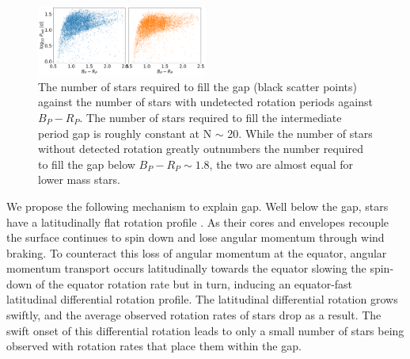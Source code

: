 \begin{figure}
\centering
    \includegraphics[width=0.5\textwidth]{Figures/rot_gap_figures/prawn_p1_p2.png}
    \caption{
    	The number of stars required to fill the gap (black scatter points) against the number of stars with undetected rotation periods against $B_P-R_P$. The number of stars required to fill the intermediate period gap is roughly constant at N $\sim$ 20. While the number of stars without detected rotation greatly outnumbers the number required to fill the gap below $B_P-R_P \sim 1.8$, the two are almost equal for lower mass stars.
}
    \label{fig:comp_prawn}
\end{figure}

We propose the following mechanism to explain gap.
Well below the gap, stars have a latitudinally flat rotation profile \cite{}.
As their cores and envelopes recouple the surface continues to spin down and lose angular momentum through wind braking.
To counteract this loss of angular momentum at the equator, angular momentum transport occurs latitudinally towards the equator slowing the spin-down of the equator rotation rate but in turn, inducing an equator-fast latitudinal differential rotation profile.
The latitudinal differential rotation grows swiftly, and the average observed rotation rates of stars drop as a result.
The swift onset of this differential rotation leads to only a small number of stars being observed with rotation rates that place them within the gap.

